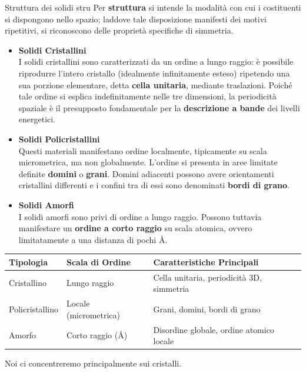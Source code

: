 \begin{note}{Struttura dei solidi}{ stru}
Per \textbf{struttura} si intende la modalità con cui i costituenti si dispongono nello spazio; laddove tale disposizione manifesti dei motivi ripetitivi, si riconoscono delle proprietà specifiche di simmetria.

\begin{itemize}
    \item \textbf{Solidi Cristallini} \\
        I solidi cristallini sono caratterizzati da un ordine a lungo raggio: è possibile riprodurre l'intero cristallo (idealmente infinitamente esteso) ripetendo una sua porzione elementare, detta \textbf{cella unitaria}, mediante traslazioni. Poiché tale ordine si esplica indefinitamente nelle tre dimensioni, la periodicità spaziale è il presupposto fondamentale per la \textbf{descrizione a bande} dei livelli energetici. 
    \item \textbf{Solidi Policristallini} \\
        Questi materiali manifestano ordine localmente, tipicamente su scala micrometrica, ma non globalmente. L'ordine si presenta in aree limitate definite \textbf{domini} o \textbf{grani}. Domini adiacenti possono avere orientamenti cristallini differenti e i confini tra di essi sono denominati \textbf{bordi di grano}.
    \item \textbf{Solidi Amorfi}\\
        I solidi amorfi sono privi di ordine a lungo raggio. Possono tuttavia manifestare un \textbf{ordine a corto raggio} su scala atomica, ovvero limitatamente a una distanza di pochi \AA.

\end{itemize}

\begin{table}[H]
\centering
\begin{tabular}{lll}
\hline
\textbf{Tipologia} & \textbf{Scala di Ordine} & \textbf{Caratteristiche Principali} \\ \hline
Cristallino & Lungo raggio & Cella unitaria, periodicità 3D, simmetria \\
Policristallino & Locale (micrometrica) & Grani, domini, bordi di grano \\
Amorfo & Corto raggio (\AA) & Disordine globale, ordine atomico locale \\ \hline
\end{tabular}
\end{table}
Noi ci concentreremo principalmente sui cristalli.

\end{note}

